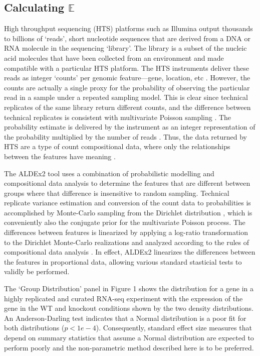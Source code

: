 \documentclass[fleqn,10pt,lineno]{wlpeerj}
\begin{document}
\subsection*{Calculating $\mathbb{E}$}
High throughput sequencing (HTS) platforms such as Illumina output thousands to billions of `reads', short nucleotide sequences that are derived from a DNA or RNA molecule in the sequencing `library'. The library is a subset of the nucleic acid molecules that have been collected from an environment and made compatible with a particular HTS platform. The HTS instruments deliver these reads as integer `counts' per genomic feature---gene, location, etc \citep{lovell2020counts}. However, the counts are actually a single proxy for the probability of observing the particular read in a sample under a repeated sampling model. This is clear since technical replicates of the same library return different counts\citep{Marioni:2008}, and the difference between technical replicates is consistent with multivariate Poisson sampling \citep{fernandes:2013, gloorAJS:2016}. The probability estimate is delivered by the instrument as an integer representation of the probability multiplied by the number of reads  \citep{fernandes:2013, gloorAJS:2016}. Thus, the data returned by HTS are a type of count compositional data, where only the relationships between the features have meaning \citep{aitchison:1986, Lovell:2015, fernandes:2014, gloorFrontiers:2017, Kaul:2017aa, Quinn:2019aa}. 

The ALDEx2 tool uses a combination of probabilistic modelling and compositional data analysis to determine the features that are different between groups where that difference is insensitive to random sampling. Technical replicate variance estimation and conversion of the count data to probabilities is accomplished by Monte-Carlo sampling from the Dirichlet distribution \citep{fernandes:2013, gloorAJS:2016}, which is conveniently also the conjugate prior for the multivariate Poisson process. The differences between features is linearized by applying a log-ratio transformation to the Dirichlet Monte-Carlo realizations and analyzed according to the rules of compositional data analysis \citep{aitchison:1986,fernandes:2013,Tsilimigras:2016aa,gloorFrontiers:2017}. In effect, ALDEx2 linearizes the differences between the features in proportional data, allowing various standard stasticial tests to validly be performed.

The `Group Distribution' panel in Figure 1 shows the distribution for a gene in a highly replicated and curated RNA-seq experiment  \citep{Schurch:2016aa} with the expression of the gene in the WT and knockout conditions  shown by the two density distributions. An Anderson-Darling test indicates that a Normal distribution is a poor fit for both distributions ($p < 1e-4$). Consequently, standard effect size measures that depend on summary statistics that assume a Normal distribution are expected to perform poorly and the non-parametric method described here is to be preferred. 
\end{document}
